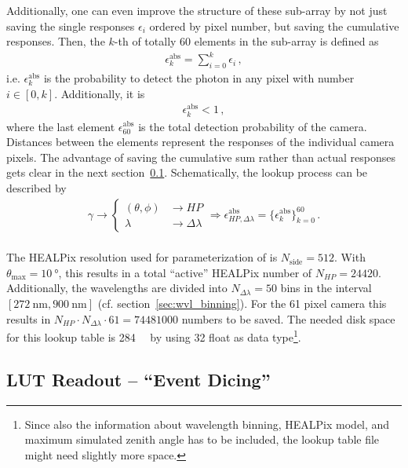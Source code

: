 Additionally, one can even improve the structure of these sub-array by not just saving the single responses $\epsilon_i$ ordered by pixel number, but saving the cumulative responses. Then, the $k$-th of totally \num{60} elements in the sub-array is defined as 
\begin{align}
	\epsilon^\text{abs}_k = \sum_{i=0}^{k} \epsilon_i\,,
	\label{eq:eps_cumulative}
\end{align}
i.e. $\epsilon^\text{abs}_k$ is the probability to detect the photon in any pixel with number $i\in[0,k]$. Additionally, it is
\begin{align}
\epsilon_k^\text{abs} < 1\,,
\end{align}
where the last element $\epsilon_{60}^\text{abs}$ is the total detection probability of the camera. Distances between the elements represent the responses of the individual camera pixels. The advantage of saving the cumulative sum rather than actual responses gets clear in the next section~\ref{sec:lut_readout}. Schematically, the lookup process can be described by
\begin{align}
	\gamma \rightarrow
	\begin{cases}
		(\theta,\phi) & \rightarrow HP\\
		\lambda & \rightarrow \Delta\lambda
	\end{cases}
	\Rightarrow \epsilon^\text{abs}_{HP,\Delta\lambda} = \{\epsilon^\text{abs}_k\}_{k=0}^{60}\,.
\end{align}\\

The HEALPix resolution used for parameterization of \iceact is $N_\text{side}=\num{512}$. With $\theta_\text{max}=\SI{10}{\degree}$, this results in a total \enquote{active} HEALPix number of $N_{HP}=\num{24420}$. Additionally, the wavelengths are divided into $N_{\Delta\lambda} = \num{50}$ bins in the interval $[\SI{272}{\nano\meter},\SI{900}{\nano\meter}]$ (cf. section~\ref{sec:wvl_binning}). For the \num{61} pixel camera this results in $N_{HP}\cdot N_{\Delta\lambda}\cdot \num{61} = \num{74481000}$ numbers to be saved. The needed disk space for this lookup table is \SI{284}{\mebi\byte} by using \SI{32}{\bit} float as data type\footnote{Since also the information about wavelength binning, HEALPix model, and maximum simulated zenith angle has to be included, the lookup table file might need slightly more space.}.

\subsection{LUT Readout -- \enquote{Event Dicing}}\label{sec:lut_readout}

